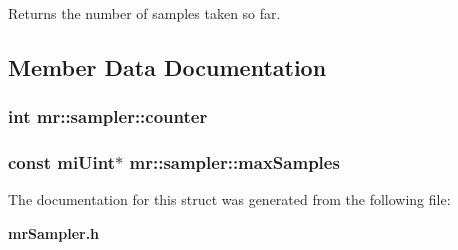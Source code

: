 Returns the number of samples taken so far. 



\subsection{Member Data Documentation}
\subsubsection{\setlength{\rightskip}{0pt plus 5cm}int {\bf mr::sampler::counter}}\label{structmr_1_1sampler_o1}


\subsubsection{\setlength{\rightskip}{0pt plus 5cm}const mi\-Uint$\ast$ {\bf mr::sampler::max\-Samples}}\label{structmr_1_1sampler_o0}




The documentation for this struct was generated from the following file:\begin{CompactItemize}
\item 
{\bf mr\-Sampler.h}\end{CompactItemize}
